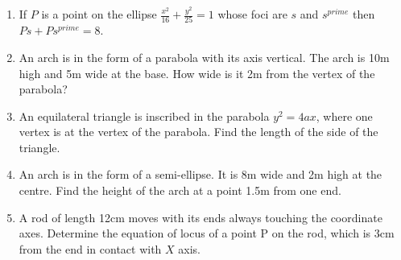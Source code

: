 \begin{enumerate}[label=\thesubsection.\arabic*,ref=\thesubsection.\theenumi]
\item If ${P}$ is a point on the ellipse $\frac{x^2}{16}+\frac{y^2}{25}=1$ whose foci  are $s$ and $s^{prime}$ then $Ps +Ps^{prime}=8$.
\item An arch is in the form of a parabola with its axis vertical. The arch is 10m high and 5m wide at the base. How wide is it 2m from the vertex of the parabola?
\label{chapters/11/11/5/2}
\item An equilateral triangle is inscribed in the parabola $y^{2} = 4ax$, where one vertex is at the vertex of the parabola. Find the length of the side of the triangle.
\label{chapters/11/11/5/8}
\item An arch is in the form of a semi-ellipse. It is 8m wide and 2m high at the centre. Find the height of the arch at a point 1.5m from one end.
\label{chapters/11/11/5/4}
\item A rod of length 12cm moves with its ends always touching the coordinate axes. Determine the equation of locus of a point  P on the rod, which is 3cm from the end in contact with $X$ axis.
\label{chapters/11/11/5/5}
\end{enumerate}
